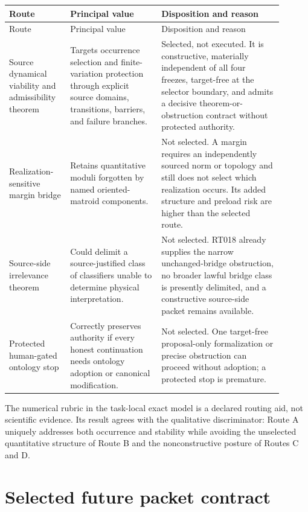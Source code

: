 \documentclass[11pt]{article}
\newcommand{\status}[1]{\textsf{#1}}
\begin{document}
\begin{longtable}{P{0.20\linewidth}P{0.30\linewidth}P{0.40\linewidth}}
\toprule
Route & Principal value & Disposition and reason \\
\midrule
\endfirsthead
\toprule
Route & Principal value & Disposition and reason \\
\midrule
\endhead
Source dynamical viability and admissibility theorem &
Targets occurrence selection and finite-variation protection through explicit
source domains, transitions, barriers, and failure branches. &
\status{Selected, not executed}.  It is constructive, materially independent
of all four freezes, target-free at the selector boundary, and admits a
decisive theorem-or-obstruction contract without protected authority. \\
Realization-sensitive margin bridge &
Retains quantitative moduli forgotten by named oriented-matroid components. &
\status{Not selected}.  A margin requires an independently sourced norm or
topology and still does not select which realization occurs.  Its added
structure and preload risk are higher than the selected route. \\
Source-side irrelevance theorem &
Could delimit a source-justified class of classifiers unable to determine
physical interpretation. &
\status{Not selected}.  RT018 already supplies the narrow unchanged-bridge
obstruction, no broader lawful bridge class is presently delimited, and a
constructive source-side packet remains available. \\
Protected human-gated ontology stop &
Correctly preserves authority if every honest continuation needs ontology
adoption or canonical modification. &
\status{Not selected}.  One target-free proposal-only formalization or precise
obstruction can proceed without adoption; a protected stop is premature. \\
\bottomrule
\end{longtable}

The numerical rubric in the task-local exact model is a declared routing aid,
not scientific evidence.  Its result agrees with the qualitative discriminator:
Route A uniquely addresses both occurrence and stability while avoiding the
unselected quantitative structure of Route B and the nonconstructive posture
of Routes C and D.

\section{Selected future packet contract}
\end{document}

